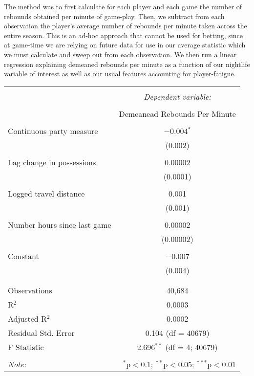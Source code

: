 \documentclass[letterpaper,12pt]{article}
\begin{document}
The method was to first calculate for each player and each game the number of rebounds obtained
per minute of game-play. Then, we subtract from each observation the player's average number of rebounds per minute taken across the entire season.
This is an ad-hoc approach that cannot be used for betting, since at game-time we are relying on future data for use in our average statistic which we must calculate and sweep out from each observation. We then run a linear regression 
explaining demeaned rebounds per minute as a function of our nightlife variable of interest
as well as our usual features accounting for player-fatigue.

\begin{tabular}{@{\extracolsep{5pt}}lc}  \\[-1.8ex]\hline  \hline \\[-1.8ex]   & \multicolumn{1}{c}{\textit{Dependent variable:}} \\  \cline{2-2}  \\[-1.8ex] & Demeanead Rebounds Per Minute \\  \hline \\[-1.8ex]   Continuous party measure & $-$0.004$^{*}$ \\    & (0.002) \\    & \\   Lag change in possessions & 0.00002 \\    & (0.0001) \\    & \\   Logged travel distance & 0.001 \\    & (0.001) \\    & \\   Number hours since last game & 0.00002 \\    & (0.00002) \\    & \\   Constant & $-$0.007 \\    & (0.004) \\    & \\  \hline \\[-1.8ex]  Observations & 40,684 \\  R$^{2}$ & 0.0003 \\  Adjusted R$^{2}$ & 0.0002 \\  Residual Std. Error & 0.104 (df = 40679) \\  F Statistic & 2.696$^{**}$ (df = 4; 40679) \\  \hline  \hline \\[-1.8ex]  \textit{Note:}  & \multicolumn{1}{r}{$^{*}$p$<$0.1; $^{**}$p$<$0.05; $^{***}$p$<$0.01} \\  \end{tabular}  
\end{document}

